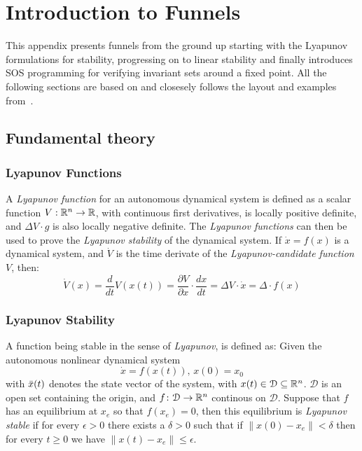 \chapter{Introduction to Funnels}
\label{sec:first-app}

This appendix presents funnels from the ground up starting with the Lyapunov
formulations for stability, progressing on to linear stability and finally
introduces \ac{SOS} programming for verifying invariant sets around a fixed
point. All the following sections are based on and closesely follows the layout
and examples from~\cite{tedrakeUnderactuatedRoboticsAlgorithms2019}.

\section{Fundamental theory}

\subsection{Lyapunov Functions}

A \textit{Lyapunov function} for an autonomous dynamical system is defined as a
scalar function \(V: \mathbb{R}^n \rightarrow \mathbb{R}\), with continuous first derivatives,
is locally positive definite, and \(\Delta V \cdot g\) is also locally negative
definite. The \textit{Lyapunov functions} can then be used to prove the
\textit{Lyapunov stability} of the dynamical system. If \(\dot{x} = f(x)\) is a
dynamical system, and \(\dot{V}\) is the time derivate of the
\textit{Lyapunov-candidate function} \(V\), then:
\[
  \dot{V}(x) = \frac{d}{dt}V(x(t)) = \frac{\partial V}{\partial x} \cdot
  \frac{dx}{dt} = \Delta V \cdot \dot{x} = \Delta \cdot f(x)
\]

\subsection{Lyapunov Stability}

A function being stable in the sense of \textit{Lyapunov}, is defined as: Given
the autonomous nonlinear dynamical system
\[
  \dot{x} = f(x(t)), \, x(0) = x_0
\]
with \(\bar{x}(t)\) denotes the state vector of the system, with \(x(t) \in
\mathcal{D} \subseteq \mathbb{R}^n\). \(\mathcal{D}\) is an open set containing the
origin, and \(f \colon \mathcal{D} \rightarrow \mathbb{R}^n\) continous on
\(\mathcal{D}\). Suppose that \(f\) has an equilibrium at \(x_e\) so that
\(f(x_e) = 0\), then this equilibrium is \textit{Lyapunov stable} if for every
\(\epsilon > 0\) there exists a \(\delta > 0\) such that if \(\left \lVert x(0)
  - x_e \right \rVert < \delta\) then for every \(t \geq 0\) we have \( \lVert
x(t) - x_e \rVert \leq \epsilon\).

